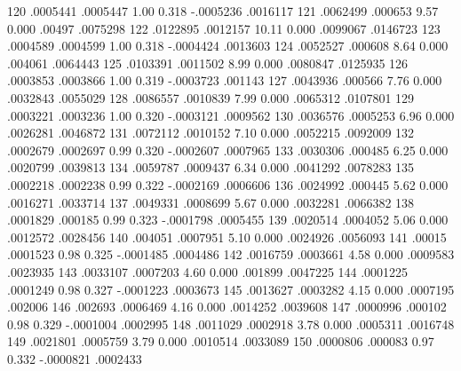         120  {\VBAR}   .0005441   .0005447     1.00   0.318    -.0005236    .0016117
        121  {\VBAR}   .0062499    .000653     9.57   0.000       .00497    .0075298
        122  {\VBAR}   .0122895   .0012157    10.11   0.000     .0099067    .0146723
        123  {\VBAR}   .0004589   .0004599     1.00   0.318    -.0004424    .0013603
        124  {\VBAR}   .0052527    .000608     8.64   0.000      .004061    .0064443
        125  {\VBAR}   .0103391   .0011502     8.99   0.000     .0080847    .0125935
        126  {\VBAR}   .0003853   .0003866     1.00   0.319    -.0003723     .001143
        127  {\VBAR}   .0043936    .000566     7.76   0.000     .0032843    .0055029
        128  {\VBAR}   .0086557   .0010839     7.99   0.000     .0065312    .0107801
        129  {\VBAR}   .0003221   .0003236     1.00   0.320    -.0003121    .0009562
        130  {\VBAR}   .0036576   .0005253     6.96   0.000     .0026281    .0046872
        131  {\VBAR}   .0072112   .0010152     7.10   0.000     .0052215    .0092009
        132  {\VBAR}   .0002679   .0002697     0.99   0.320    -.0002607    .0007965
        133  {\VBAR}   .0030306    .000485     6.25   0.000     .0020799    .0039813
        134  {\VBAR}   .0059787   .0009437     6.34   0.000     .0041292    .0078283
        135  {\VBAR}   .0002218   .0002238     0.99   0.322    -.0002169    .0006606
        136  {\VBAR}   .0024992    .000445     5.62   0.000     .0016271    .0033714
        137  {\VBAR}   .0049331   .0008699     5.67   0.000     .0032281    .0066382
        138  {\VBAR}   .0001829    .000185     0.99   0.323    -.0001798    .0005455
        139  {\VBAR}   .0020514   .0004052     5.06   0.000     .0012572    .0028456
        140  {\VBAR}    .004051   .0007951     5.10   0.000     .0024926    .0056093
        141  {\VBAR}     .00015   .0001523     0.98   0.325    -.0001485    .0004486
        142  {\VBAR}   .0016759   .0003661     4.58   0.000     .0009583    .0023935
        143  {\VBAR}   .0033107   .0007203     4.60   0.000      .001899    .0047225
        144  {\VBAR}   .0001225   .0001249     0.98   0.327    -.0001223    .0003673
        145  {\VBAR}   .0013627   .0003282     4.15   0.000     .0007195     .002006
        146  {\VBAR}    .002693   .0006469     4.16   0.000     .0014252    .0039608
        147  {\VBAR}   .0000996    .000102     0.98   0.329    -.0001004    .0002995
        148  {\VBAR}   .0011029   .0002918     3.78   0.000     .0005311    .0016748
        149  {\VBAR}   .0021801   .0005759     3.79   0.000     .0010514    .0033089
        150  {\VBAR}   .0000806    .000083     0.97   0.332    -.0000821    .0002433
